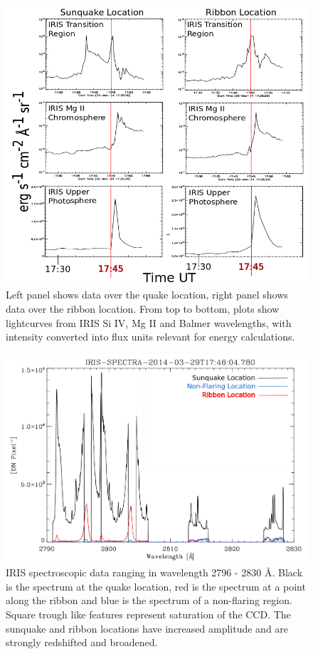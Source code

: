 \begin{figure}%
  \begin{center}
  \includegraphics[width=1.0\textwidth]{lcfluxseries}
  \end{center}
  \caption{Left panel shows data over the quake location, right panel shows data over the ribbon location. From top to bottom, plots show lightcurves from IRIS Si IV, Mg II and Balmer wavelengths, with intensity converted into flux units relevant for energy calculations.}\label{lcfluxseries}
\end{figure}

\begin{figure}%
  \begin{center}
  \includegraphics[width=1.0\textwidth]{spectra}
  \end{center}
  \caption{IRIS spectroscopic data ranging in wavelength 2796 - 2830 \AA. Black is the spectrum at the quake location, red is the spectrum at a point along the ribbon and blue is the spectrum of a non-flaring region. Square trough like features represent saturation of the CCD. The sunquake and ribbon locations have increased amplitude and are strongly redshifted and broadened.}
\end{figure}\label{spectra}



